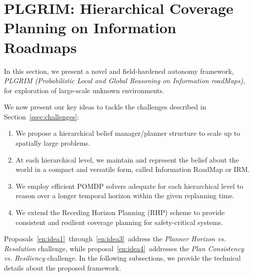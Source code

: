 \documentclass[letterpaper]{article} %
\newcommand{\phdone}[1]{} %
\begin{document}
\section{PLGRIM: Hierarchical Coverage Planning on Information Roadmaps}
\label{sec:plgrim}

\phdone{Framework Overview}
In this section, we present a novel and field-hardened autonomy framework, \textit{PLGRIM (Probabilistic Local and Global Reasoning on Information roadMaps)}, for exploration of large-scale unknown environments.

We now present our key ideas to tackle the challenges described in Section~\ref{ssec:challenges}:


\vspace{-4pt}
\begin{enumerate}[label={\arabic*)}]
  \itemsep0em 
  \setlength{\itemsep}{0pt}
  \setlength{\parskip}{0pt}
  \item \label{en:idea1} We propose a hierarchical belief manager/planner structure to scale up to spatially large problems.
  \item \label{en:idea2} At each hierarchical level, we maintain and represent the belief about the world in a compact and versatile form, called Information RoadMap  or IRM.
  \item \label{en:idea3} We employ efficient POMDP solvers adequate for each hierarchical level to reason over a longer temporal horizon within the given replanning time.
  \item \label{en:idea4} We extend the Receding Horizon Planning (RHP) scheme to provide consistent and resilient coverage planning for safety-critical systems.
\end{enumerate}
\vspace{-4pt}


Proposals~\ref{en:idea1}~through~\ref{en:idea3}~address the \textit{Planner Horizon vs. Resolution} challenge, while proposal~\ref{en:idea4}~addresses the \textit{Plan Consistency vs. Resiliency} challenge. In the following subsections, we provide the technical details about the proposed framework.
\end{document}
